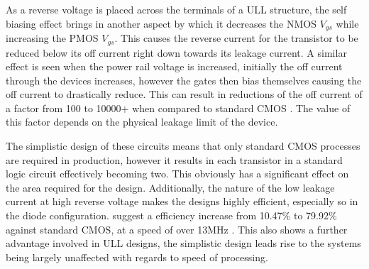 As a reverse voltage is placed across the terminals of a \ac{ULL} structure, the self biasing effect brings in another aspect by which it decreases the NMOS $V_{gs}$ while increasing the PMOS $V_{gs}$.
This causes the reverse current for the transistor to be reduced below its off current right down towards its leakage current.
A similar effect is seen when the power rail voltage is increased, initially the off current through the devices increases, however the gates then bias themselves causing the off current to drastically reduce.
This can result in reductions of the off current of a factor from 100 to 10000+ when compared to standard CMOS \cite{ULL-AandD,DisruptiveULL}.
The value of this factor depends on the physical leakage limit of the device.

The simplistic design of these circuits means that only standard CMOS processes are required in production, however it results in each transistor in a standard logic circuit effectively becoming two.
This obviously has a significant effect on the area required for the design.
Additionally, the nature of the low leakage current at high reverse voltage makes the designs highly efficient, especially so in the diode configuration.
\citeauthor{DisruptiveULL} suggest a efficiency increase from 10.47\% to 79.92\% against standard CMOS, at a speed of over 13MHz \cite{DisruptiveULL}.
This also shows a further advantage involved in ULL designs, the simplistic design leads rise to the systems being largely unaffected with regards to speed of processing.
